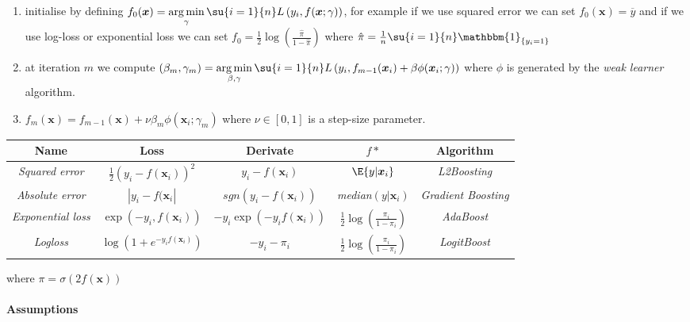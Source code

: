 \begin{enumerate}
    \item initialise by defining $f_{0}(\bm{x}) = \displaystyle\argmin_{\gamma}\su{i=1}{n}L\left(
        y_{i},f(\bm{x};\gamma)\right)$, for example if we use squared error we can
        set $f_{0}(\bm{x})=\overline{y}$ and if we use log-loss or exponential loss we can set       
        $f_{0}=\frac{1}{2}\log\left(\frac{\hat{\pi}}{1-\hat{\pi}}\right)$ where $\hat{\pi} = 
        \frac{1}{n}\su{i=1}{n}\mathbbm{1}_{\{y_{i}=1\}}$
    \item at iteration $m$ we compute $(\beta_{m},\gamma_{m}) = \displaystyle\argmin_{\beta,\gamma}
        \su{i=1}{n}L\left(y_{i},f_{m-1}(\bm{x}_{i})+\beta\phi(\bm{x}_{i};\gamma) 
        \right)$ where $\phi$ is generated by the \emph{weak learner} algorithm.
    \item $f_{m}(\bm{x}) = f_{m-1}(\bm{x}) + \nu\beta_{m}\phi(\bm{x}_{i};\gamma_{m})$ where $\nu\in
        [0,1]$ is a step-size parameter.
\end{enumerate}

\begin{center}
    \begin{tabular}{|*{5}{c|}}
    \hline
    \textbf{Name} & \textbf{Loss}& \textbf{Derivate}& \textbf{$f{*}$} & \textbf{Algorithm}\\
    \hline
    \emph{Squared error} & $\frac{1}{2}\left(y_{i}-f(\bm{x}_{i})\right)^{2}$ & 
    $y_{i}-f(\bm{x}_{i})$ & $\E{y|\bm{x}_{i}}$ & \emph{L2Boosting}\\
    \hline
    \emph{Absolute error} & $|y_{i}-f(\bm{x}_{i}|$ & 
    $sgn(y_{i}-f(\bm{x}_{i}))$ & \emph{median}$(y|\bm{x}_{i})$ & \emph{Gradient 
    Boosting}\\
    \hline
    \emph{Exponential loss} & $\exp\left(-y_{i},f(\bm{x}_{i})\right)$ & $-y_{i}\exp(
    -y_{i}f(\bm{x}_{i}))$ & $\frac{1}{2}\log\left(\frac{\pi_{i}}{1 - \pi_{i}}\right)$&
    \emph{AdaBoost}\\
    \hline
    \emph{Logloss} & $\log\left(1+e^{-y_{i}f(\bm{x}_{i})}\right)$ & $-y_{i}-\pi_{i}$ &
    $\frac{1}{2}\log\left(\frac{\pi_{i}}{1 - \pi_{i}}\right)$ & \emph{LogitBoost}\\
    \hline
    \end{tabular}
\end{center}
where $\pi=\sigma\left(2f(\bm{x})\right)$


\paragraph{Assumptions}
